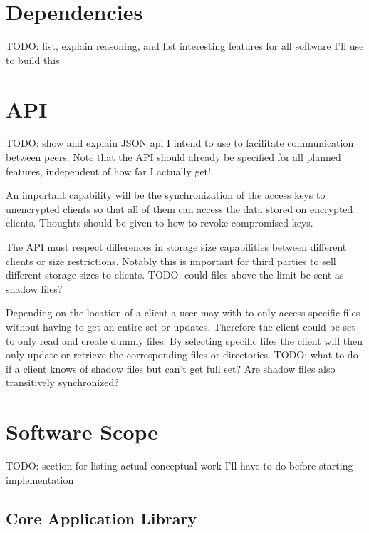 \section{Dependencies}

TODO: list, explain reasoning, and list interesting features for all software I'll use to build this

\section{API}

TODO: show and explain JSON api I intend to use to facilitate communication between peers.
Note that the API should already be specified for all planned features, independent of how far I actually get!

\begin{description}[leftmargin=2em,style=nextline,noitemsep,nolistsep]
\item[Encryption Key Management]
    An important capability will be the synchronization of the access keys to unencrypted clients so that all of them can access the data stored on encrypted clients.
    Thoughts should be given to how to revoke compromised keys.
\item[Space Management]
    The API must respect differences in storage size capabilities between different clients or size restrictions.
    Notably this is important for third parties to sell different storage sizes to clients.
    TODO: could files above the limit be sent as shadow files?
\item[Shadow Files]
    Depending on the location of a client a user may with to only access specific files without having to get an entire set or updates.
    Therefore the client could be set to only read and create dummy files.
    By selecting specific files the client will then only update or retrieve the corresponding files or directories.
    TODO: what to do if a client knows of shadow files but can't get full set?
    Are shadow files also transitively synchronized?
\end{description}

\section{Software Scope}

TODO: section for listing actual conceptual work I'll have to do before starting implementation

\subsection{Core Application Library}

